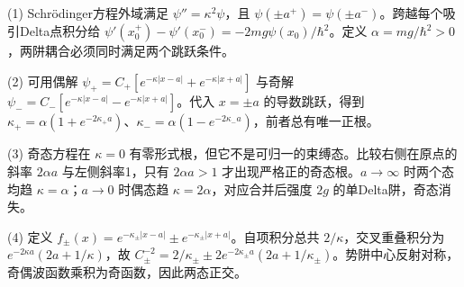 (1) Schrödinger方程外域满足 \(\psi''=\kappa^2\psi\)，且 \(\psi(\pm a^+)=\psi(\pm a^-)\)。跨越每个吸引Delta点积分给 \(\psi'(x_0^+)-\psi'(x_0^-)=-2mg\psi(x_0)/\hbar^2\)。定义 \(\alpha=mg/\hbar^2>0\)，两阱耦合必须同时满足两个跳跃条件。

(2) 可用偶解 \(\psi_+=C_+[e^{-\kappa|x-a|}+e^{-\kappa|x+a|}]\) 与奇解 \(\psi_-=C_-[e^{-\kappa|x-a|}-e^{-\kappa|x+a|}]\)。代入 \(x=\pm a\) 的导数跳跃，得到 \(\boxed{\kappa_+=\alpha(1+e^{-2\kappa_+a})}\)、\(\boxed{\kappa_-=\alpha(1-e^{-2\kappa_-a})}\)，前者总有唯一正根。

(3) 奇态方程在 \(\kappa=0\) 有零形式根，但它不是可归一的束缚态。比较右侧在原点的斜率 \(2\alpha a\) 与左侧斜率1，只有 \(\boxed{2\alpha a>1}\) 才出现严格正的奇态根。\(a\to\infty\) 时两个态均趋 \(\kappa=\alpha\)；\(a\to0\) 时偶态趋 \(\kappa=2\alpha\)，对应合并后强度 \(2g\) 的单Delta阱，奇态消失。

(4) 定义 \(f_\pm(x)=e^{-\kappa_\pm|x-a|}\pm e^{-\kappa_\pm|x+a|}\)。自项积分总共 \(2/\kappa\)，交叉重叠积分为 \(e^{-2\kappa a}(2a+1/\kappa)\)，故 \(\boxed{C_\pm^{-2}=2/\kappa_\pm\pm2e^{-2\kappa_\pm a}(2a+1/\kappa_\pm)}\)。势阱中心反射对称，奇偶波函数乘积为奇函数，因此两态正交。
